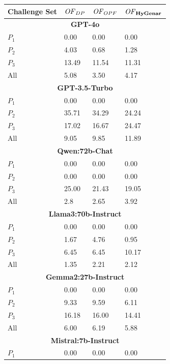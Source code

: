 \begin{table}
\centering
\begin{tabularx}{\textwidth}{l X X X}
\toprule
\textbf{Challenge Set} & \textbf{$\mathit{OF}_{DP}$} & \textbf{$\mathit{OF}_{OPF}$} & \textbf{$\mathit{OF}_{\textbf{HyGenar}}$} \\
\midrule
\multicolumn{4}{c}{\small\textbf{GPT-4o}} \\
\midrule
$P_1$ 
& 0.00 
& 0.00 
& 0.00 \\
$P_2$ 
& 4.03 
& 0.68 
& 1.28 \\
$P_3$ 
& 13.49 
& 11.54 
& 11.31\\
All 
& 5.08
& 3.50 
& 4.17\\
\midrule
\multicolumn{4}{c}{\small\textbf{GPT-3.5-Turbo}} \\
\midrule
$P_1$ 
& 0.00 
& 0.00
& 0.00\\
$P_2$ 
& 35.71
& 34.29
& 24.24\\
$P_3$ 
& 17.02
& 16.67
& 24.47\\
All 
& 9.05 
& 9.85
& 11.89\\
\midrule
\multicolumn{4}{c}{\small\textbf{Qwen:72b-Chat}} \\
\midrule
$P_1$ 
& 0.00 
& 0.00
& 0.00\\
$P_2$ 
& 0.00 
& 0.00 
& 0.00\\
$P_3$ 
& 25.00 
& 21.43
& 19.05\\
All 
& 2.8 
& 2.65
& 3.92\\
\midrule
\multicolumn{4}{c}{\small\textbf{Llama3:70b-Instruct}} \\
\midrule
$P_1$ 
& 0.00
& 0.00
& 0.00\\
$P_2$ 
& 1.67 
& 4.76 
& 0.95\\
$P_3$ 
& 6.45 
& 6.45 
& 10.17\\
All 
& 1.35 
& 2.21
& 2.12\\
\midrule
\multicolumn{4}{c}{\small\textbf{Gemma2:27b-Instruct}} \\
\midrule
$P_1$ 
& 0.00
& 0.00
& 0.00\\
$P_2$ 
& 9.33 
& 9.59 
& 6.11\\
$P_3$ 
& 16.18
& 16.00
& 14.41\\
All 
& 6.00 
& 6.19
& 5.88\\
\midrule
\multicolumn{4}{c}{\small\textbf{Mistral:7b-Instruct}} \\
\midrule
$P_1$ 
& 0.00 
& 0.00
& 0.00\\

\end{tabularx}
\end{table}
